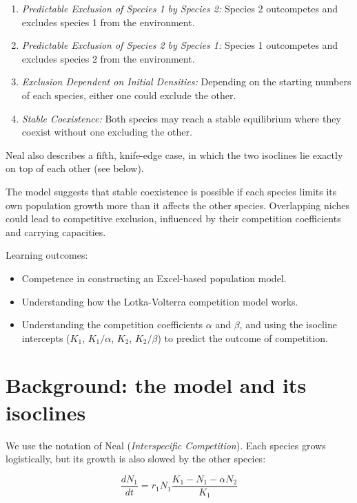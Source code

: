 \documentclass[
  a4paper]{book}
\providecommand{\tightlist}{%
  \setlength{\itemsep}{0pt}\setlength{\parskip}{0pt}}
\begin{document}
\begin{enumerate}
\def\labelenumi{\arabic{enumi}.}
\tightlist
\item
  \emph{Predictable Exclusion of Species 1 by Species 2:} Species 2 outcompetes and excludes species 1 from the environment.
\item
  \emph{Predictable Exclusion of Species 2 by Species 1:} Species 1 outcompetes and excludes species 2 from the environment.
\item
  \emph{Exclusion Dependent on Initial Densities:} Depending on the starting numbers of each species, either one could exclude the other.
\item
  \emph{Stable Coexistence:} Both species may reach a stable equilibrium where they coexist without one excluding the other.
\end{enumerate}

Neal also describes a fifth, knife-edge case, in which the two isoclines lie exactly on top of each other (see below).

The model suggests that stable coexistence is possible if each species limits its own population growth more than it affects the other species. Overlapping niches could lead to competitive exclusion, influenced by their competition coefficients and carrying capacities.

Learning outcomes:

\begin{itemize}
\tightlist
\item
  Competence in constructing an Excel-based population model.
\item
  Understanding how the Lotka-Volterra competition model works.
\item
  Understanding the competition coefficients \(\alpha\) and \(\beta\), and using the isocline intercepts (\(K_1\), \(K_1/\alpha\), \(K_2\), \(K_2/\beta\)) to predict the outcome of competition.
\end{itemize}

\section{Background: the model and its isoclines}\label{background-the-model-and-its-isoclines}

We use the notation of Neal (\emph{Interspecific Competition}). Each species grows logistically, but its growth is also slowed by the other species:

\[\frac{dN_1}{dt} = r_1 N_1 \frac{K_1 - N_1 - \alpha N_2}{K_1}\]
\end{document}
